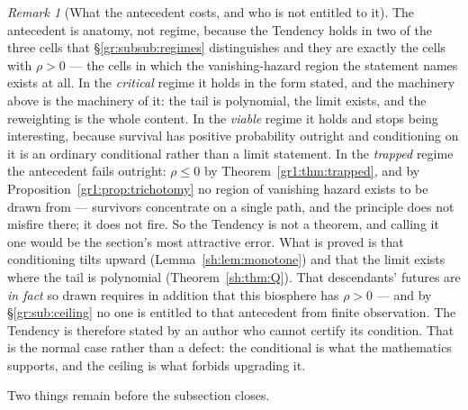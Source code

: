 \documentclass[11pt]{article}
\numberwithin{equation}{section}
\theoremstyle{plain}
\theoremstyle{definition}
\theoremstyle{remark}
\newtheorem{remark}[theorem]{Remark}
\begin{document}
\begin{remark}[What the antecedent costs, and who is not entitled to it]\label{ac:rem:regimes}
The antecedent is anatomy, not regime, because the Tendency holds in two of the three cells that \S\ref{gr:subsub:regimes} distinguishes and they are exactly the cells with $\rho > 0$ --- the cells in which the vanishing-hazard region the statement names exists at all. In the \emph{critical} regime it holds in the form stated, and the machinery above is the machinery of it: the tail is polynomial, the limit exists, and the reweighting is the whole content. In the \emph{viable} regime it holds and stops being interesting, because survival has positive probability outright and conditioning on it is an ordinary conditional rather than a limit statement. In the \emph{trapped} regime the antecedent fails outright: $\rho \le 0$ by Theorem~\ref{gr1:thm:trapped}, and by Proposition~\ref{gr1:prop:trichotomy} no region of vanishing hazard exists to be drawn from --- survivors concentrate on a single path, and the principle does not misfire there; it does not fire. So the Tendency is not a theorem, and calling it one would be the section's most attractive error. What is proved is that conditioning tilts upward (Lemma~\ref{sh:lem:monotone}) and that the limit exists where the tail is polynomial (Theorem~\ref{sh:thm:Q}). That descendants' futures are \emph{in fact} so drawn requires in addition that this biosphere has $\rho > 0$ --- and by \S\ref{gr:sub:ceiling} no one is entitled to that antecedent from finite observation. The Tendency is therefore stated by an author who cannot certify its condition. That is the normal case rather than a defect: the conditional is what the mathematics supports, and the ceiling is what forbids upgrading it.
\end{remark}

Two things remain before the subsection closes.
\end{document}
